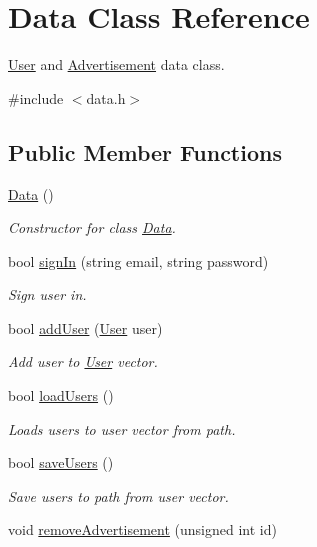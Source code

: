 \hypertarget{class_data}{}\section{Data Class Reference}
\label{class_data}


\hyperlink{class_user}{User} and \hyperlink{class_advertisement}{Advertisement} data class.  




{\ttfamily \#include $<$data.\+h$>$}

\subsection*{Public Member Functions}
\begin{DoxyCompactItemize}
\item 
\hypertarget{class_data_af11f741cb7f587e2e495452a8905a22a}{}\hyperlink{class_data_af11f741cb7f587e2e495452a8905a22a}{Data} ()\label{class_data_af11f741cb7f587e2e495452a8905a22a}

\begin{DoxyCompactList}\small\item\em Constructor for class \hyperlink{class_data}{Data}. \end{DoxyCompactList}\item 
bool \hyperlink{class_data_a4dd197a4768f96f882ec6f093abd8d1c}{sign\+In} (string email, string password)
\begin{DoxyCompactList}\small\item\em Sign user in. \end{DoxyCompactList}\item 
bool \hyperlink{class_data_a7d8a17cd3323b4db1e1a39ce85094cff}{add\+User} (\hyperlink{class_user}{User} user)
\begin{DoxyCompactList}\small\item\em Add user to \hyperlink{class_user}{User} vector. \end{DoxyCompactList}\item 
bool \hyperlink{class_data_af6bfff017e2428145e1f723c41f62e55}{load\+Users} ()
\begin{DoxyCompactList}\small\item\em Loads users to user vector from path. \end{DoxyCompactList}\item 
bool \hyperlink{class_data_aaf1fcf32ff1e5aab2dbdba338740ea41}{save\+Users} ()
\begin{DoxyCompactList}\small\item\em Save users to path from user vector. \end{DoxyCompactList}\item 
\hypertarget{class_data_aef09da10593bb91b3ae2f627bfc55951}{}void \hyperlink{class_data_aef09da10593bb91b3ae2f627bfc55951}{remove\+Advertisement} (unsigned int id)\label{class_data_aef09da10593bb91b3ae2f627bfc55951}


\end{DoxyCompactItemize}
